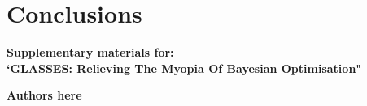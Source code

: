 \documentclass[twoside]{article}
\begin{document}

\section{Conclusions}\label{sec:conclusions}




\newpage
\clearpage
\setcounter{section}{0}
\setcounter{equation}{0}
\renewcommand{\thesection}{S\arabic{section}}
\renewcommand{\theequation}{S.\arabic{equation}}
\onecolumn
\begin{center}
{\Large  \textbf{Supplementary materials for:\\
`GLASSES: Relieving The Myopia Of Bayesian Optimisation"}}
\end{center}
\begin{center}
\textbf{Authors here}
\end{center}

\vspace{1cm}
\end{document}
